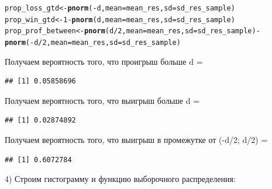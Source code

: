 \documentclass{article}\usepackage[]{graphicx}\usepackage[]{color}
\makeatletter
\newcommand{\hlnum}[1]{\textcolor[rgb]{0.686,0.059,0.569}{#1}}%
\newcommand{\hlopt}[1]{\textcolor[rgb]{0,0,0}{#1}}%
\newcommand{\hlstd}[1]{\textcolor[rgb]{0.345,0.345,0.345}{#1}}%
\newcommand{\hlkwb}[1]{\textcolor[rgb]{0.69,0.353,0.396}{#1}}%
\newcommand{\hlkwc}[1]{\textcolor[rgb]{0.333,0.667,0.333}{#1}}%
\newcommand{\hlkwd}[1]{\textcolor[rgb]{0.737,0.353,0.396}{\textbf{#1}}}%
\newenvironment{kframe}{%
 \def\at@end@of@kframe{}%
 \ifinner\ifhmode%
  \def\at@end@of@kframe{\end{minipage}}%
  \begin{minipage}{\columnwidth}%
 \fi\fi%
 \def\FrameCommand##1{\hskip\@totalleftmargin \hskip-\fboxsep
 \colorbox{shadecolor}{##1}\hskip-\fboxsep
     \hskip-\linewidth \hskip-\@totalleftmargin \hskip\columnwidth}%
 \MakeFramed {\advance\hsize-\width
   \@totalleftmargin\z@ \linewidth\hsize
   \@setminipage}}%
 {\par\unskip\endMakeFramed%
 \at@end@of@kframe}
\newenvironment{knitrout}{}{} %
\makeatother
\begin{document}
\begin{knitrout}
\color{fgcolor}\begin{kframe}
\begin{alltt}
\hlstd{prop_loss_gtd} \hlkwb{<-} \hlkwd{pnorm}\hlstd{(}\hlopt{-}\hlstd{d,} \hlkwc{mean} \hlstd{= mean_res,} \hlkwc{sd} \hlstd{= sd_res_sample)}
\hlstd{prop_win_gtd} \hlkwb{<-} \hlnum{1} \hlopt{-} \hlkwd{pnorm}\hlstd{(d,} \hlkwc{mean} \hlstd{= mean_res,} \hlkwc{sd} \hlstd{= sd_res_sample)}
\hlstd{prop_prof_between} \hlkwb{<-} \hlkwd{pnorm}\hlstd{(d}\hlopt{/}\hlnum{2}\hlstd{,} \hlkwc{mean} \hlstd{= mean_res,} \hlkwc{sd} \hlstd{= sd_res_sample)} \hlopt{-}
\hlkwd{pnorm}\hlstd{(}\hlopt{-}\hlstd{d}\hlopt{/}\hlnum{2}\hlstd{,} \hlkwc{mean} \hlstd{= mean_res,} \hlkwc{sd} \hlstd{= sd_res_sample)}
\end{alltt}
\end{kframe}
\end{knitrout}
Получаем вероятность того, что проигрыш больше d = 
\begin{knitrout}
\color{fgcolor}\begin{kframe}
\begin{verbatim}
## [1] 0.05858696
\end{verbatim}
\end{kframe}
\end{knitrout}
Получаем вероятность того, что выигрыш больше d = 
\begin{knitrout}
\color{fgcolor}\begin{kframe}
\begin{verbatim}
## [1] 0.02874892
\end{verbatim}
\end{kframe}
\end{knitrout}
Получаем вероятность того, что выигрыш в промежутке от (-d/2; d/2) = 
\begin{knitrout}
\color{fgcolor}\begin{kframe}
\begin{verbatim}
## [1] 0.6072784
\end{verbatim}
\end{kframe}
\end{knitrout}
\newpage

4) Строим гистограмму и функцию выборочного распределения:
\end{document}
